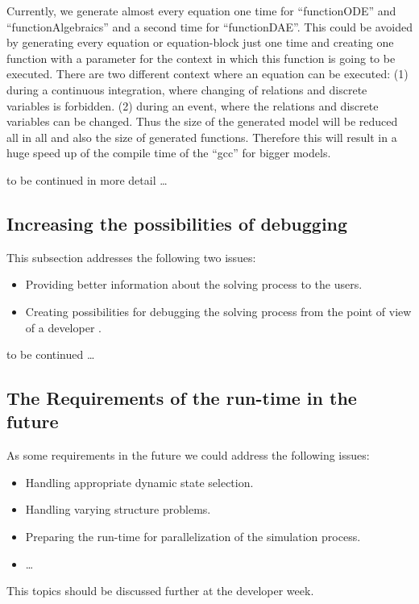 Currently, we generate almost every equation one time for ``functionODE'' and
``functionAlgebraics'' and a second time for ``functionDAE''. This could be
avoided by generating every equation or equation-block just one time and
creating one function with a parameter for the context in which this function
is going to be executed. There are two different context where an equation
can be executed: (1) during a continuous integration, where changing of
relations and discrete variables is forbidden. (2) during an event, where the
relations and discrete variables can be changed. 
Thus the size of the generated model will be reduced all in all and also the
size of generated functions. Therefore this will result in a huge speed
up of the compile time of the ``gcc'' for bigger models. 

to be continued in more detail \ldots

\subsection{Increasing the possibilities of debugging}\label{sec:debugging}

This subsection addresses the following two issues:
\begin{itemize}
  \item Providing better information about the solving process to the users.
  \item Creating possibilities for debugging the solving process from the
  point of view of a developer \cite{Pop2007}.
\end{itemize}

to be continued \ldots

\subsection{The Requirements of the run-time in the
future}\label{sec:runtimefuture}

As some requirements in the future we could address the following issues:
\begin{itemize}
  \item Handling appropriate dynamic state selection.  
  \item Handling varying structure problems. 
  \item Preparing the run-time for parallelization of the simulation
  process. 
 \item \ldots
\end{itemize}
This topics should be discussed further at the developer week. 


